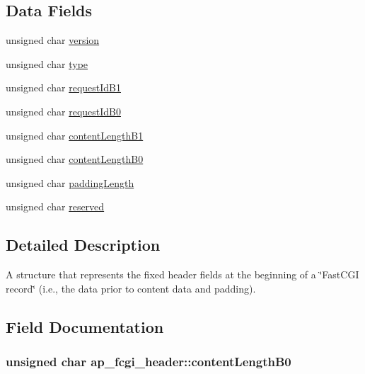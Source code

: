 \subsection*{Data Fields}
\begin{DoxyCompactItemize}
\item 
unsigned char \hyperlink{structap__fcgi__header_a88df2a2ab4436eb42a99c02c9293e0de}{version}
\item 
unsigned char \hyperlink{structap__fcgi__header_a09797b9bd0fefaa9d9883605e177080c}{type}
\item 
unsigned char \hyperlink{structap__fcgi__header_a731ec669c70b97e67aa9a056622bb35e}{request\+Id\+B1}
\item 
unsigned char \hyperlink{structap__fcgi__header_ade42ce07e3d43fc9056a8d8b371564b6}{request\+Id\+B0}
\item 
unsigned char \hyperlink{structap__fcgi__header_a791f3d05f747a02bc01bd3385c717216}{content\+Length\+B1}
\item 
unsigned char \hyperlink{structap__fcgi__header_a12381ed12a0c1513b384893c730ca3d8}{content\+Length\+B0}
\item 
unsigned char \hyperlink{structap__fcgi__header_a7c6cda148f19984036878241d5d613d2}{padding\+Length}
\item 
unsigned char \hyperlink{structap__fcgi__header_a26f15c205fc8cbb0987636081adf5402}{reserved}
\end{DoxyCompactItemize}


\subsection{Detailed Description}
A structure that represents the fixed header fields at the beginning of a \char`\"{}\+Fast\+C\+G\+I record\char`\"{} (i.\+e., the data prior to content data and padding). 

\subsection{Field Documentation}
\subsubsection[{\texorpdfstring{content\+Length\+B0}{contentLengthB0}}]{\setlength{\rightskip}{0pt plus 5cm}unsigned char ap\+\_\+fcgi\+\_\+header\+::content\+Length\+B0}\hypertarget{structap__fcgi__header_a12381ed12a0c1513b384893c730ca3d8}{}\label{structap__fcgi__header_a12381ed12a0c1513b384893c730ca3d8}
